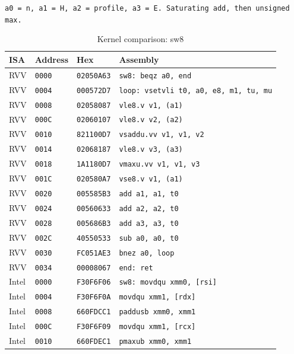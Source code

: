 \begin{table}[htbp]
\centering
\caption{Kernel comparison: sw8}
\begingroup
\scriptsize
\setlength{\tabcolsep}{4pt}
\noindent \texttt{a0 = n, a1 = H, a2 = profile, a3 = E. Saturating add, then unsigned max.}\par
\vspace{0.6ex}
\begin{tabular}{@{}l|l|l|p{7.2cm}@{}}
\toprule
ISA & Address & Hex & Assembly \\
\midrule
RVV & \texttt{0000} & \texttt{02050A63} & \texttt{sw8: beqz a0, end} \\
RVV & \texttt{0004} & \texttt{000572D7} & \texttt{loop: vsetvli t0, a0, e8, m1, tu, mu} \\
RVV & \texttt{0008} & \texttt{02058087} & \texttt{vle8.v v1, (a1)} \\
RVV & \texttt{000C} & \texttt{02060107} & \texttt{vle8.v v2, (a2)} \\
RVV & \texttt{0010} & \texttt{821100D7} & \texttt{vsaddu.vv v1, v1, v2} \\
RVV & \texttt{0014} & \texttt{02068187} & \texttt{vle8.v v3, (a3)} \\
RVV & \texttt{0018} & \texttt{1A1180D7} & \texttt{vmaxu.vv v1, v1, v3} \\
RVV & \texttt{001C} & \texttt{020580A7} & \texttt{vse8.v v1, (a1)} \\
RVV & \texttt{0020} & \texttt{005585B3} & \texttt{add a1, a1, t0} \\
RVV & \texttt{0024} & \texttt{00560633} & \texttt{add a2, a2, t0} \\
RVV & \texttt{0028} & \texttt{005686B3} & \texttt{add a3, a3, t0} \\
RVV & \texttt{002C} & \texttt{40550533} & \texttt{sub a0, a0, t0} \\
RVV & \texttt{0030} & \texttt{FC051AE3} & \texttt{bnez a0, loop} \\
RVV & \texttt{0034} & \texttt{00008067} & \texttt{end: ret} \\
\midrule
Intel & \texttt{0000} & \texttt{F30F6F06} & \texttt{sw8: movdqu xmm0, [rsi]} \\
Intel & \texttt{0004} & \texttt{F30F6F0A} & \texttt{movdqu xmm1, [rdx]} \\
Intel & \texttt{0008} & \texttt{660FDCC1} & \texttt{paddusb xmm0, xmm1} \\
Intel & \texttt{000C} & \texttt{F30F6F09} & \texttt{movdqu xmm1, [rcx]} \\
Intel & \texttt{0010} & \texttt{660FDEC1} & \texttt{pmaxub xmm0, xmm1} \\

\end{tabular}
\end{table}
